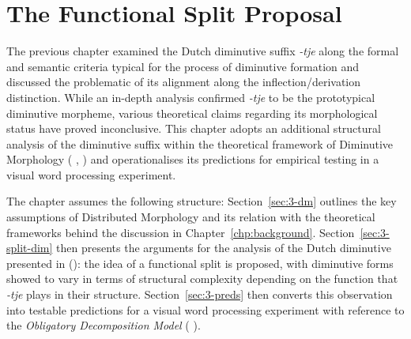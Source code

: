 \chapter{The Functional Split Proposal}\label{chp:proposal}
The previous chapter examined the Dutch diminutive suffix \textit{-tje} along the formal and semantic criteria typical for the process of diminutive formation and discussed the problematic of its alignment along the inflection/derivation distinction. While an in-depth analysis confirmed \textit{-tje} to be the prototypical diminutive morpheme, various theoretical claims regarding its morphological status have proved inconclusive. This chapter adopts an additional structural analysis of the diminutive suffix within the theoretical framework of Diminutive Morphology (\citeauthor{Halle+Marantz+1993} \citeyear{Halle+Marantz+1993}, \citeyear{Halle+Marantz+1994}) and operationalises its predictions for empirical testing in a visual word processing experiment. 

The chapter assumes the following structure: Section~\ref{sec:3-dm} outlines the key assumptions of Distributed Morphology and its relation with the theoretical frameworks behind the discussion in Chapter~\ref{chp:background}. Section~\ref{sec:3-split-dim} then presents the arguments for the analysis of the Dutch diminutive presented in \citeauthor{DeBelder+etal+2014} (\citeyear{DeBelder+etal+2014}): the idea of a functional split is proposed, with diminutive forms showed to vary in terms of structural complexity depending on the function that \textit{-tje} plays in their structure. Section~\ref{sec:3-preds} then converts this observation into testable predictions for a visual word processing experiment with reference to the \textit{Obligatory Decomposition Model} (\citeauthor{Taft+1979} \citeyear{Taft+1979}).

